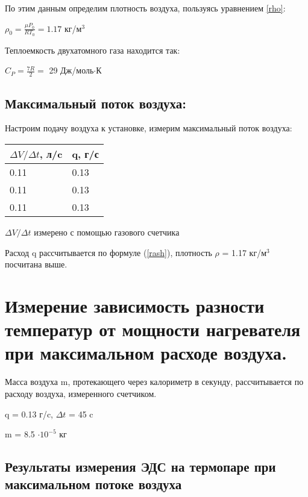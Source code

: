 \documentclass[a4paper,17pt]{article}
\begin{document}
        По этим данным определим плотность воздуха, пользуясь уравнением \ref{rho}:
        \begin{center}
            $\rho_0=\frac{\mu P_0}{RT_0} = 1.17$ кг/м$^3$\label{rho_res} 
        \end{center}
           
        
        Теплоемкость двухатомного газа находится так:
        \begin{center}
            $C_P = \frac{7R}{2}=$ 29 Дж/моль$\cdot$К    
        \end{center}
            
        
    \subsection{Максимальный поток воздуха:}       
        Настроим подачу воздуха к установке, измерим максимальный поток воздуха:
        
        \begin{center}
            \begin{tabular}{ | l | l |}
                \hline
                $\Delta V / \Delta t$, л/c & q, г/с \\ \hline
                0.11    &   0.13 \\
                0.11    &   0.13 \\
                0.11    &   0.13 \\
                \hline
            \end{tabular}
            
        $\Delta V / \Delta t$ измерено с помощью газового счетчика
        \end{center}        
        Расход q рассчитывается по формуле (\ref{rash}), плотность $\rho$ = 1.17 кг/м$^3$ посчитана выше.
        
\newpage
\section{Измерение зависимость разности температур от мощности нагревателя при максимальном расходе воздуха.}
    Масса воздуха m, протекающего через калориметр в секунду, рассчитывается по расходу воздуха, измеренного счетчиком.
    
    q = 0.13 г/c, $\Delta t$ = 45 c
    
    m = 8.5 $\cdot 10^{-5}$ кг
    
    \subsection{Результаты измерения ЭДС на термопаре при максимальном потоке воздуха}
    
\end{document}
